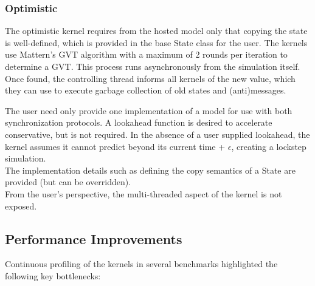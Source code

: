 \subsubsection{Optimistic}
The optimistic kernel requires from the hosted model only that copying the state is well-defined, which is provided in the base State class for the user. 
The kernels use Mattern's \cite{mattern}
GVT algorithm with a maximum of 2 rounds per iteration to determine a GVT. This process runs asynchronously from the simulation itself. Once found, the controlling thread informs all kernels of the new value, which they can use to execute garbage collection of old states and (anti)messages. 

The user need only provide one implementation of a model for use with both synchronization protocols. A lookahead function is desired to accelerate conservative, but is not required. In the absence of a user supplied lookahead, the kernel assumes it cannot predict beyond its current time + $\epsilon$, creating a lockstep simulation. %
\\
The implementation details such as defining the copy semantics of a State are provided (but can be overridden). \\
From the user's perspective, the multi-threaded aspect of the kernel is not exposed. %

\subsection{Performance Improvements}
Continuous profiling of the kernels in several benchmarks highlighted the following key bottlenecks: 
